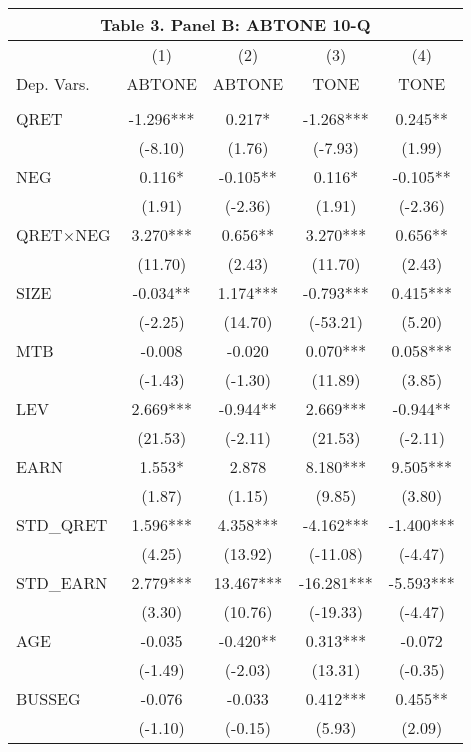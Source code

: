 \begin{table}[htbp] \label{T3PB}
  \centering
    \begin{tabular}{lcccc}
    \multicolumn{5}{c}{\textbf{Table 3. Panel B: ABTONE 10-Q}} \\
    \midrule
      & (1) & (2) & (3) & (4) \\
    Dep. Vars. & ABTONE & ABTONE & TONE & TONE \\
    \midrule
      &   &   &   &  \\
    QRET & -1.296*** & 0.217* & -1.268*** & 0.245** \\
      & (-8.10) & (1.76) & (-7.93) & (1.99) \\
    NEG & 0.116* & -0.105** & 0.116* & -0.105** \\
      & (1.91) & (-2.36) & (1.91) & (-2.36) \\
    \rowcolor[rgb]{ .933,  .925,  .882} QRET$\times$NEG & 3.270*** & 0.656** & 3.270*** & 0.656** \\
    \rowcolor[rgb]{ .933,  .925,  .882}   & (11.70) & (2.43) & (11.70) & (2.43) \\
    SIZE & -0.034** & 1.174*** & -0.793*** & 0.415*** \\
      & (-2.25) & (14.70) & (-53.21) & (5.20) \\
    MTB & -0.008 & -0.020 & 0.070*** & 0.058*** \\
      & (-1.43) & (-1.30) & (11.89) & (3.85) \\
    LEV & 2.669*** & -0.944** & 2.669*** & -0.944** \\
      & (21.53) & (-2.11) & (21.53) & (-2.11) \\
    EARN & 1.553* & 2.878 & 8.180*** & 9.505*** \\
      & (1.87) & (1.15) & (9.85) & (3.80) \\
    STD\_QRET & 1.596*** & 4.358*** & -4.162*** & -1.400*** \\
      & (4.25) & (13.92) & (-11.08) & (-4.47) \\
    STD\_EARN & 2.779*** & 13.467*** & -16.281*** & -5.593*** \\
      & (3.30) & (10.76) & (-19.33) & (-4.47) \\
    AGE & -0.035 & -0.420** & 0.313*** & -0.072 \\
      & (-1.49) & (-2.03) & (13.31) & (-0.35) \\
    BUSSEG & -0.076 & -0.033 & 0.412*** & 0.455** \\
      & (-1.10) & (-0.15) & (5.93) & (2.09) \\

\end{tabular}
\end{table}

